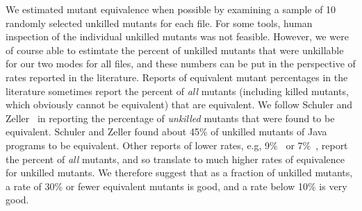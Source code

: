 \documentclass[sigconf,review, anonymous]{acmart}
\begin{document}
{We estimated mutant equivalence when possible by examining a sample of
10 randomly selected unkilled mutants for each file.  For some tools,
human inspection of the individual unkilled mutants was not feasible.
However, we were of course able to estimtate the percent of unkilled
mutants that were unkillable for our two modes for all files, and
these numbers can be put in the perspective of rates reported in the
literature.  Reports of equivalent mutant percentages in the
literature sometimes report the percent of \emph{all} mutants
(including killed mutants, which obviously cannot be equivalent) that
are equivalent.  We follow Schuler and Zeller~\cite{EquivMut} in
reporting the percentage of \emph{unkilled} mutants that were found to
be equivalent.  Schuler and Zeller found about 45\% of unkilled
mutants of Java programs to be equivalent.  Other reports of lower
rates, e.g, 9\%~\cite{offutt1997automatically} or 7\%~\cite{TCE}, report the percent of
\emph{all} mutants, and so translate to much higher rates of
equivalence for unkilled mutants.  We therefore suggest that as a
fraction of unkilled mutants, a rate of 30\% or fewer equivalent
mutants is good, and a rate below 10\% is very good.


\begin{table}[htbp]
\centering
\caption{C++ (Our Implementation vs. Dextool)}
\label{tab:table_cpp2}
\end{table}}
\end{document}
